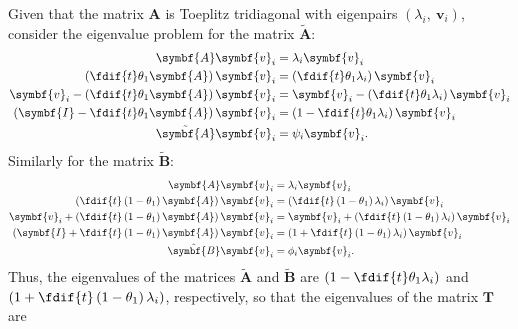 \documentclass{article}
\begin{document}
Given that the matrix \(\symbf{A}\) is Toeplitz tridiagonal with
eigenpairs \(\left( \lambda_i,\: \symbf{v}_i \right)\), consider the
eigenvalue problem for the matrix \(\tilde{\symbf{A}}\):
\begin{align*}
    \symbf{A} \symbf{v}_i                                                & = \lambda_i \symbf{v}_i                                                \\
    \left( \fdif{t} \theta_1 \symbf{A} \right) \symbf{v}_i               & = \left( \fdif{t} \theta_1 \lambda_i \right) \symbf{v}_i               \\
    \symbf{v}_i - \left( \fdif{t} \theta_1 \symbf{A} \right) \symbf{v}_i & = \symbf{v}_i - \left( \fdif{t} \theta_1 \lambda_i \right) \symbf{v}_i \\
    \left( \symbf{I} - \fdif{t} \theta_1 \symbf{A} \right) \symbf{v}_i   & = \left( 1 - \fdif{t} \theta_1 \lambda_i \right) \symbf{v}_i           \\
    \tilde{\symbf{A}} \symbf{v}_i                                        & = \psi_i \symbf{v}_i.
\end{align*}
Similarly for the matrix \(\tilde{\symbf{B}}\):
\begin{align*}
    \symbf{A} \symbf{v}_i                                                                   & = \lambda_i \symbf{v}_i                                                                   \\
    \left( \fdif{t} \left( 1 - \theta_1 \right) \symbf{A} \right) \symbf{v}_i               & = \left( \fdif{t} \left( 1 - \theta_1 \right) \lambda_i \right) \symbf{v}_i               \\
    \symbf{v}_i + \left( \fdif{t} \left( 1 - \theta_1 \right) \symbf{A} \right) \symbf{v}_i & = \symbf{v}_i + \left( \fdif{t} \left( 1 - \theta_1 \right) \lambda_i \right) \symbf{v}_i \\
    \left( \symbf{I} + \fdif{t} \left( 1 - \theta_1 \right) \symbf{A} \right) \symbf{v}_i   & = \left( 1 + \fdif{t} \left( 1 - \theta_1 \right) \lambda_i \right) \symbf{v}_i           \\
    \tilde{\symbf{B}} \symbf{v}_i                                                           & = \phi_i \symbf{v}_i.
\end{align*}
Thus, the eigenvalues of the matrices \(\tilde{\symbf{A}}\) and
\(\tilde{\symbf{B}}\) are \(\left( 1 - \fdif{t} \theta_1 \lambda_i \right)\)
and \(\left( 1 + \fdif{t} \left( 1 - \theta_1 \right) \lambda_i \right)\),
respectively, so that the eigenvalues of the matrix \(\symbf{T}\) are
\end{document}
